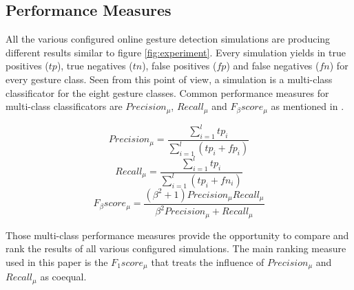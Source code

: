 \subsection{Performance Measures} \label{performance_measures}

All the various configured online gesture detection simulations are producing different results similar to figure
\ref{fig:experiment}. Every simulation yields in true positives ($tp$), true negatives ($tn$), false positives ($fp$)
and false negatives ($fn$) for every gesture class. Seen from this point of view, a simulation is a multi-class
classificator for the eight gesture classes. Common performance measures for multi-class classificators are
$Precision_{\mu}$, $Recall_{\mu}$ and $F_{\beta}score_{\mu}$ as mentioned in \cite{sokolova2009systematic}.

\begin{equation}
    Precision_{\mu} = \frac{\sum \limits_{i=1}^{l} tp_i}{\sum \limits_{i=1}^{l} (tp_i + fp_i)}
\end{equation}
\begin{equation}
    Recall_{\mu} = \frac{\sum \limits_{i=1}^{l} tp_i}{\sum \limits_{i=1}^{l} (tp_i + fn_i)}
\end{equation}
\begin{equation}
    F_{\beta}score_{\mu} = \frac{(\beta^2 + 1)Precision_{\mu} Recall_{\mu}}{\beta^2 Precision_{\mu} + Recall_{\mu}}
\end{equation}

Those multi-class performance measures provide the opportunity to compare and rank the results of all various configured
simulations. The main ranking measure used in this paper is the $F_{1}score_{\mu}$ that treats the influence of
$Precision_{\mu}$ and $Recall_{\mu}$ as coequal.
